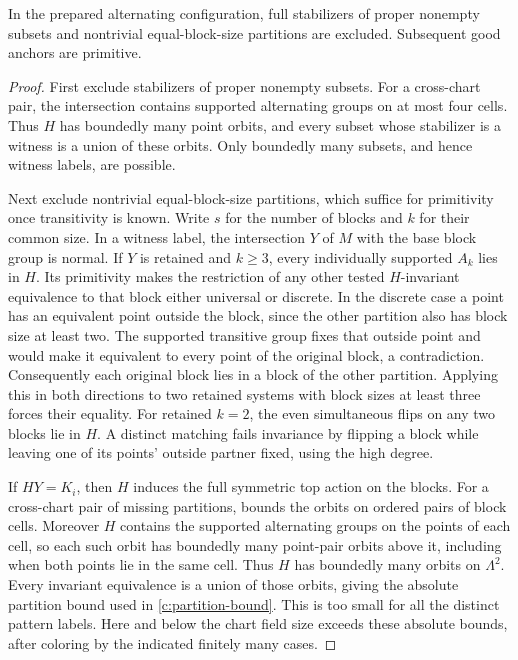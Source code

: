 \begin{proposition}\label{c:alternating-primitivity}
In the prepared alternating configuration, full stabilizers of proper nonempty subsets and nontrivial equal-block-size partitions are excluded. Subsequent good anchors are primitive.
\end{proposition}

\begin{proof}
First exclude stabilizers of proper nonempty subsets. For a cross-chart
pair, the intersection contains supported alternating groups on at most
four cells. Thus $H$ has boundedly many point orbits, and every subset
whose stabilizer is a witness is a union of these orbits. Only boundedly
many subsets, and hence witness labels, are possible.

Next exclude nontrivial equal-block-size partitions, which suffice for
primitivity once transitivity is known. Write $s$ for the number of
blocks and $k$ for their common size. In a witness label, the
intersection $Y$ of $M$ with the base block group is normal. If $Y$ is
retained and $k\ge3$, every individually supported $A_k$ lies in $H$.
Its primitivity makes the restriction of any other tested
$H$-invariant equivalence to that block either universal or discrete.
In the discrete case a point has an equivalent point outside the block,
since the other partition also has block size at least two. The
supported transitive group fixes that outside point and would make it
equivalent to every point of the original block, a contradiction.
Consequently each original block lies in a block of the other partition.
Applying this in both directions to two retained systems with block
sizes at least three forces their equality. For retained $k=2$, the
even simultaneous flips on any two blocks lie in $H$. A distinct
matching fails invariance by flipping a block while leaving one of its
points' outside partner fixed, using the high degree.

If $HY=K_i$, then $H$ induces the full symmetric top action on the
blocks. For a cross-chart pair of missing partitions,
 bounds the orbits on ordered pairs of block
cells. Moreover $H$ contains the supported alternating groups on the
points of each cell, so each such orbit has boundedly many point-pair
orbits above it, including when both points lie in the same cell.
Thus $H$ has boundedly many orbits on $\Lambda^2$. Every invariant
equivalence is a union of those orbits, giving the absolute partition
bound used in \eqref{c:partition-bound}. This is too small for all the
distinct pattern labels. Here and below the chart field size exceeds
these absolute bounds, after coloring by the indicated finitely many
cases.
\end{proof}

